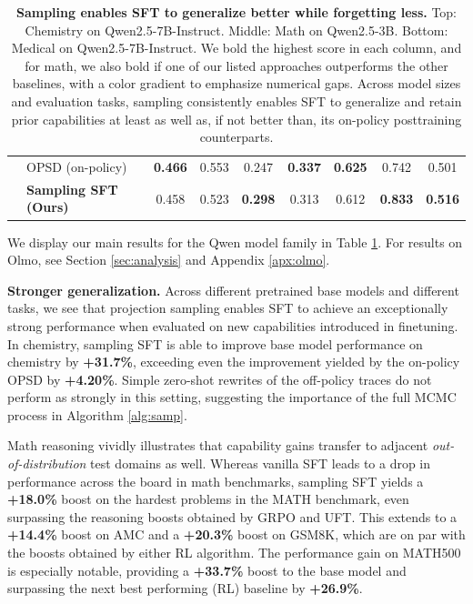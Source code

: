 \documentclass{article}
\begin{document}
\begin{table}[t]
{\begin{tabular}{ll|c|cccccc}
& OPSD (on-policy)
& \textbf{\textcolor[HTML]{005321}{0.466}}
& \textcolor[HTML]{53B466}{0.553}
& \textcolor[HTML]{42AB5D}{0.247}
& \textbf{\textcolor[HTML]{005321}{0.337}}
& \textbf{\textcolor[HTML]{005321}{0.625}}
& \textcolor[HTML]{097532}{0.742}
& \textcolor[HTML]{006428}{0.501} \\

& \textbf{Sampling SFT (Ours)}
& \textcolor[HTML]{2E964D}{0.458}
& \textcolor[HTML]{98D594}{0.523}
& \textbf{\textcolor[HTML]{005321}{0.298}}
& \textcolor[HTML]{05712F}{0.313}
& \textcolor[HTML]{005E26}{0.612}
& \textbf{\textcolor[HTML]{005321}{0.833}}
& \textbf{\textcolor[HTML]{005321}{0.516}} \\

\bottomrule
\end{tabular}
}

\vspace{5pt}

\caption{
\textbf{Sampling enables SFT to generalize better while forgetting less.}
Top: Chemistry on Qwen2.5-7B-Instruct.
Middle: Math on Qwen2.5-3B. Bottom: Medical on Qwen2.5-7B-Instruct. We bold the highest score in each column, and for math, we also bold if one of our listed approaches outperforms the other baselines, with a color gradient to emphasize numerical gaps. Across model sizes and evaluation tasks, sampling consistently enables SFT to generalize and retain prior capabilities at least as well as, if not better than, its on-policy posttraining counterparts.}
\label{table:mega_results}

\end{table}



We display our main results for the Qwen model family in Table \ref{table:mega_results}. For results on Olmo, see Section \ref{sec:analysis} and Appendix \ref{apx:olmo}.


\textbf{Stronger generalization.} Across different pretrained base models and different tasks, we see that projection sampling enables SFT to achieve an exceptionally strong performance when evaluated on new capabilities introduced in finetuning. In chemistry, sampling SFT is able to improve base model performance on chemistry by \textbf{+31.7\%}, exceeding even the improvement yielded by the on-policy OPSD by 
\textbf{+4.20\%}. Simple zero-shot rewrites of the off-policy traces do not perform as strongly in this setting, suggesting the importance of the full MCMC process in Algorithm \ref{alg:samp}. 

Math reasoning vividly illustrates that capability gains transfer to adjacent \textit{out-of-distribution} test domains as well. Whereas vanilla SFT leads to a drop in performance across the board in math benchmarks, sampling SFT yields a \textbf{+18.0\%} boost on the hardest problems in the MATH benchmark, even surpassing the reasoning boosts obtained by GRPO and UFT. This extends to a \textbf{+14.4\%} boost on AMC and a \textbf{+20.3\%} boost on GSM8K, which are on par with the boosts obtained by either RL algorithm. The performance gain on MATH500 is especially notable, providing a \textbf{+33.7\%} boost to the base model and surpassing the next best performing (RL) baseline by \textbf{+26.9\%}. 
\end{document}
